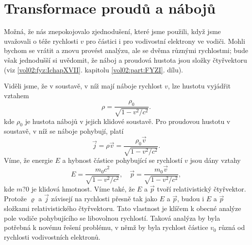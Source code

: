   \section{Transformace proudů a nábojů}\label{fyz:IIchapXIIIsecVII}
    Možná, že nás znepokojovalo zjednodušení, které jsme použili, když jsme uvažovali o téže
    rychlosti \(v\) pro částici i pro vodivostní elektrony ve vodiči. Mohli bychom se vrátit a znovu
    provést analýzu, ale se dvěma různými rychlostmi; bude však jednodušší si uvědomit, že náboj a
    proudová hustota jsou složky čtyřvektoru (viz \ref{vol02:fyz:IchapXVII}. kapitolu \ref{vol02:part:FYZI}.
    dílu). 
    
    Viděli jsme, že v soustavě, v níž mají náboje rychlost \(v\), lze hustotu vyjádřit vztahem
    \begin{equation*}
      ρ=\dfrac{ρ_0}{\sqrt{1−v^2/c^2}}.
    \end{equation*}
    kde \(ρ_0\) je hustota nábojů v jejich klidové soustavě. Pro proudovou hustotu v soustavě, v níž
    se náboje pohybují, platí
    \begin{equation}\label{fyz:eq890}
      \vec{j}=ρ\vec{v}=\dfrac{ρ_0\vec{v}}{\sqrt{1−v^2/c^2}}.
    \end{equation}
    Víme, že energie \(E\) a hybnost částice pohybující se rychlostí \(v\) jsou dány vztahy
    \begin{equation*}
      E=\dfrac{m_0c^2}{\sqrt{1−v^2/c^2}}, \quad \vec{p}=\dfrac{m_0\vec{v}}{\sqrt{1−v^2/c^2}},
    \end{equation*}
    kde \(m?0\) je klidová hmotnost. Víme také, že \(E\) a \(\vec{p}\) tvoří relativistický
    čtyřvektor. Protože \(\varrho\) a \(\vec{j}\) závisejí na rychlosti přesně tak jako \(E\) a
    \(\vec{p}\), budou i \(E\) a \(\vec{p}\) složkami relativistického čtyřvektoru. Tato vlastnost
    je klíčem k obecné analýze pole vodiče pohybujícího se libovolnou rychlostí. Taková analýza by
    byla potřebná k novému řešení problému, v němž by byla rychlost částice \(v_0\) různá od
    rychlosti vodivostních elektronů.

